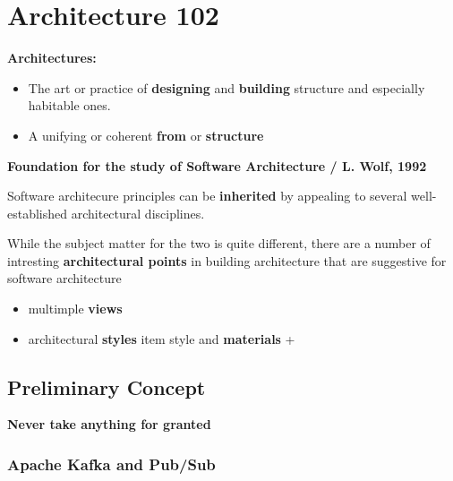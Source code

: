 \section{Architecture 102}



\textbf{Architectures:}
\begin{itemize}
	\item The art or practice of \textbf{designing} and \textbf{building} structure and especially habitable ones.
	\item A unifying or coherent \textbf{from} or \textbf{structure}
\end{itemize}

\textbf{Foundation for the study of Software Architecture / L. Wolf, 1992}

Software architecure principles can be \textbf{inherited} by appealing to several well-established architectural disciplines.

While the subject matter for the two is quite different, there are a number of intresting \textbf{architectural points} in building architecture that are suggestive for software architecture
\begin{itemize}
	\item multimple \textbf{views}
	\item architectural \textbf{styles}
	item style and \textbf{materials}
+\end{itemize}

\subsection{Preliminary Concept}

\textbf{Never take anything for granted}

\subsubsection{Apache Kafka and Pub/Sub}

